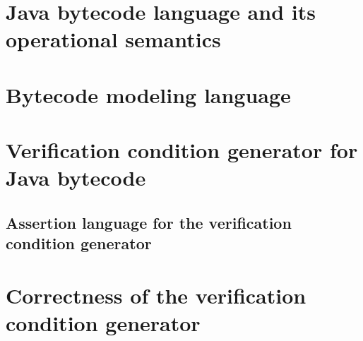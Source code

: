 \documentclass[10pt,a4paper]{book}
\begin{document}
\chapter{Java bytecode language and its operational semantics} \label{opSem:prelim}
     
   
   
   
   
   
   
   
   
   
   
  
   
  
   


\chapter{Bytecode modeling language} \label{bcsl}
  \lstset{numbers=left,numberstyle=\small,stepnumber=1,numbersep=5pt}
   
  
  
  
  
  





\chapter{Verification condition generator for Java bytecode } \label{wpGeneral}
  


\section{Assertion language for the verification condition generator}\label{assertLang}
  \label{assertLang}
  
  
   
   
  
   
  
  
  
   
  

\chapter{Correctness of the verification condition generator}\label{proofGeneral}
  
   
  
  
  
  
\end{document}
